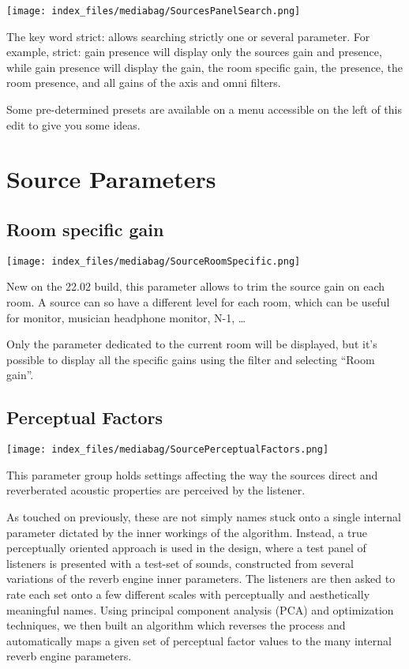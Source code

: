 \documentclass[
  letterpaper,
  DIV=11,
  numbers=noendperiod]{scrreport}
\begin{document}
\texttt{[image: index\_files/mediabag/SourcesPanelSearch.png]}

The key word strict: allows searching strictly one or several parameter.
For example, strict: gain presence will display only the sources gain
and presence, while gain presence will display the gain, the room
specific gain, the presence, the room presence, and all gains of the
axis and omni filters.

Some pre-determined presets are available on a menu accessible on the
left of this edit to give you some ideas.

\hypertarget{source-parameters}{%
\chapter{Source Parameters}\label{source-parameters}}

\hypertarget{room-specific-gain}{%
\section{Room specific gain}\label{room-specific-gain}}

\texttt{[image: index\_files/mediabag/SourceRoomSpecific.png]}

New on the 22.02 build, this parameter allows to trim the source gain on
each room. A source can so have a different level for each room, which
can be useful for monitor, musician headphone monitor, N-1, \ldots{}

Only the parameter dedicated to the current room will be displayed, but
it's possible to display all the specific gains using the filter and
selecting ``Room gain''.

\hypertarget{perceptual-factors}{%
\section{Perceptual Factors}\label{perceptual-factors}}

\texttt{[image: index\_files/mediabag/SourcePerceptualFactors.png]}

This parameter group holds settings affecting the way the sources direct
and reverberated acoustic properties are perceived by the listener.

As touched on previously, these are not simply names stuck onto a single
internal parameter dictated by the inner workings of the algorithm.
Instead, a true perceptually oriented approach is used in the design,
where a test panel of listeners is presented with a test-set of sounds,
constructed from several variations of the reverb engine inner
parameters. The listeners are then asked to rate each set onto a few
different scales with perceptually and aesthetically meaningful names.
Using principal component analysis (PCA) and optimization techniques, we
then built an algorithm which reverses the process and automatically
maps a given set of perceptual factor values to the many internal reverb
engine parameters.
\end{document}
